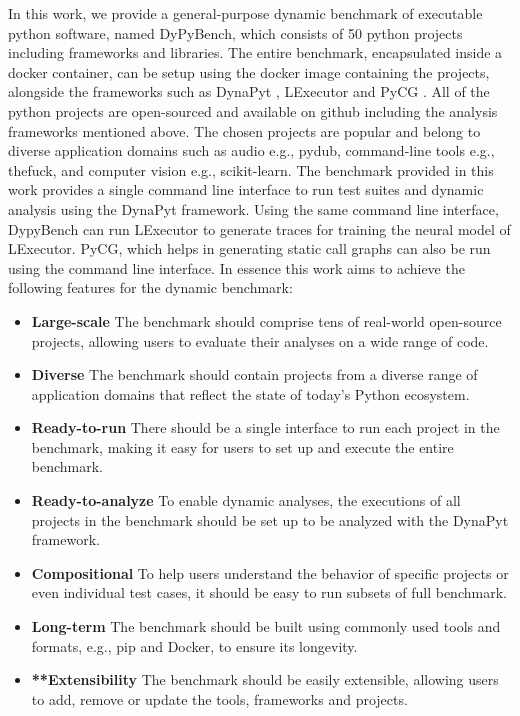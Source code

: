 In this work, we provide a general-purpose dynamic benchmark of executable python software, named DyPyBench, which consists of 50 python projects including frameworks and libraries. The entire benchmark, encapsulated inside a docker container, can be setup using the docker image containing the projects, alongside the frameworks such as DynaPyt \cite{DynaPyt2022}, LExecutor \cite{LExecutor_2023} and PyCG \cite{PyCG_2021}. All of the python projects are open-sourced and available on github \cite{github} including the analysis frameworks mentioned above. The chosen projects are popular and belong to diverse application domains such as audio e.g., pydub, command-line tools e.g., thefuck, and computer vision e.g., scikit-learn. The benchmark provided in this work provides a single command line interface to run test suites and dynamic analysis using the DynaPyt framework. Using the same command line interface, DypyBench can run LExecutor to generate traces for training the neural model of LExecutor. PyCG, which helps in generating static call graphs can also be run using the command line interface. In essence this work aims to achieve the following features for the dynamic benchmark:
\begin{itemize}
    \item \textbf{Large-scale} The benchmark should comprise tens of real-world open-source projects, allowing users to evaluate their analyses on a wide range of code.
    \item \textbf{Diverse} The benchmark should contain projects from a diverse range of application domains that reflect the state of today's Python ecosystem.
    \item \textbf{Ready-to-run} There should be a single interface to run each project in the benchmark, making it easy for users to set up and execute the entire benchmark.
    \item \textbf{Ready-to-analyze} To enable dynamic analyses, the executions of all projects in the benchmark should be set up to be analyzed with the DynaPyt framework.
    \item \textbf{Compositional} To help users understand the behavior of specific projects or even individual test cases, it should be easy to run subsets of full benchmark.
    \item \textbf{Long-term} The benchmark should be built using commonly used tools and formats, e.g., pip and Docker, to ensure its longevity.
    \item \textbf{**Extensibility} The benchmark should be easily extensible, allowing users to add, remove or update the tools, frameworks and projects.  
\end{itemize}

